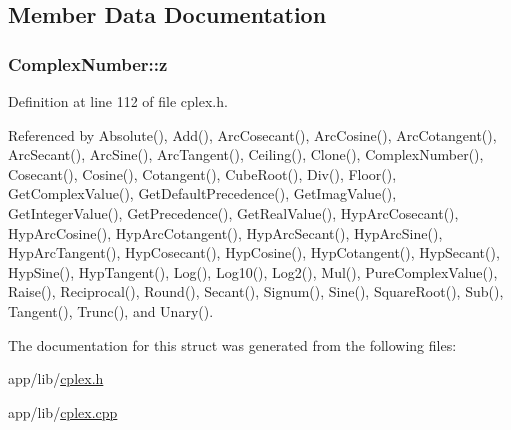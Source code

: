 \subsection{Member Data Documentation}
\subsubsection[{\texorpdfstring{z}{z}}]{ Complex\+Number\+::z\hspace{0.3cm}{\ttfamily [private]}}\hypertarget{structComplexNumber_a5f72da71f4ce0d88076a391369239042}{}\label{structComplexNumber_a5f72da71f4ce0d88076a391369239042}


Definition at line 112 of file cplex.\+h.



Referenced by Absolute(), Add(), Arc\+Cosecant(), Arc\+Cosine(), Arc\+Cotangent(), Arc\+Secant(), Arc\+Sine(), Arc\+Tangent(), Ceiling(), Clone(), Complex\+Number(), Cosecant(), Cosine(), Cotangent(), Cube\+Root(), Div(), Floor(), Get\+Complex\+Value(), Get\+Default\+Precedence(), Get\+Imag\+Value(), Get\+Integer\+Value(), Get\+Precedence(), Get\+Real\+Value(), Hyp\+Arc\+Cosecant(), Hyp\+Arc\+Cosine(), Hyp\+Arc\+Cotangent(), Hyp\+Arc\+Secant(), Hyp\+Arc\+Sine(), Hyp\+Arc\+Tangent(), Hyp\+Cosecant(), Hyp\+Cosine(), Hyp\+Cotangent(), Hyp\+Secant(), Hyp\+Sine(), Hyp\+Tangent(), Log(), Log10(), Log2(), Mul(), Pure\+Complex\+Value(), Raise(), Reciprocal(), Round(), Secant(), Signum(), Sine(), Square\+Root(), Sub(), Tangent(), Trunc(), and Unary().



The documentation for this struct was generated from the following files\+:\begin{DoxyCompactItemize}
\item 
app/lib/\hyperlink{cplex_8h}{cplex.\+h}\item 
app/lib/\hyperlink{cplex_8cpp}{cplex.\+cpp}\end{DoxyCompactItemize}
